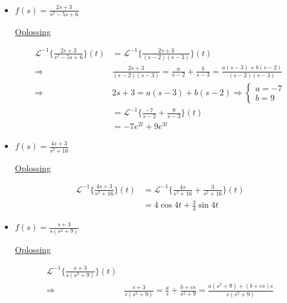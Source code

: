 \documentclass[12pt]{report}
\newcommand{\exercise}[2]{
#1


\underline{Oplossing}

#2

\hrulefill
}
\begin{document}
\begin{itemize}[label={}]
{{\begin{equation*}
\begin{split}
         \end{split}
        \end{equation*}
    }
 }
 \item{
    \exercise{
        $f(s) = \frac{2s + 3}{s^2 - 5s + 6}$
    }{
        \begin{equation*}
         \begin{split}
          \mathcal{L}^{-1}\bigg\{\frac{2s + 3}{s^2 - 5s + 6}\bigg\}(t) & = \mathcal{L}^{-1}\bigg\{\frac{2s + 3}{(s-2)(s-3)}\bigg\}(t) \\
          \Rightarrow & \frac{2s + 3}{(s-2)(s-3)} = \frac{a}{s - 2} + \frac{b}{s-3} = \frac{a(s-3) + b(s-2)}{(s-2)(s-3)} \\
          \Rightarrow & 2s + 3 = a(s-3) + b(s-2) \Rightarrow \begin{cases}
                                                              a = -7 \\
                                                              b = 9
                                                             \end{cases} \\
                                                             & =  \mathcal{L}^{-1}\bigg\{\frac{-7}{s - 2} + \frac{9}{s - 3}\bigg\}(t) \\
                                                             & = -7e^{2t} + 9e^{3t}
         \end{split}
        \end{equation*}
    }
 }
 \item{
    \exercise{
        $f(s) = \frac{4s + 3}{s^2 + 16}$
    }{
        \begin{equation*}
         \begin{split}
          \mathcal{L}^{-1}\bigg\{\frac{4s + 3}{s^2 + 16}\bigg\}(t) & = \mathcal{L}^{-1}\bigg\{\frac{4s}{s^2 + 16} + \frac{3}{s^2 + 16}\bigg\}(t) \\
          & = 4\cos 4t + \frac{3}{4}\sin 4t
         \end{split}
        \end{equation*}
    }
 }
 \item{
    \exercise{
        $f(s) = \frac{s + 3}{s(s^2 + 9)}$
    }{
        \begin{equation*}
         \begin{split}
          \mathcal{L}^{-1}\bigg\{\frac{s + 3}{s(s^2 + 9)}\bigg\}(t) \\
          \Rightarrow & \frac{s + 3}{s(s^2 + 9)} = \frac{a}{s} + \frac{b + cs}{s^2 + 9} = \frac{a(s^2 + 9) + (b+cs)s}{s(s^2 + 9)} \\

\end{split}
\end{equation*}}}
\end{itemize}
\end{document}
